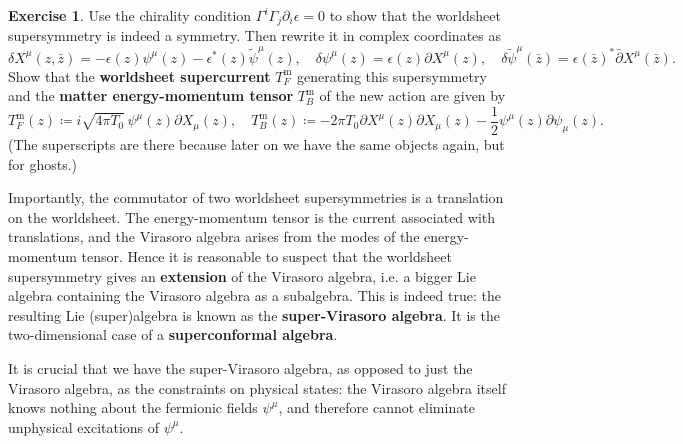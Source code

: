 \documentclass{report}
\theoremstyle{plain}
\theoremstyle{definition}
\newtheorem{exercise}{Exercise}[section]
\theoremstyle{remark}
\newcommand{\di}{\partial}
\newcommand{\bz}{\bar{z}}
\newcommand{\bdi}{\bar{\di}}
\begin{document}
\begin{exercise}
  Use the chirality condition $\Gamma^i \Gamma_j \di_i \epsilon = 0$
  to show that the worldsheet supersymmetry is indeed a symmetry. Then
  rewrite it in complex coordinates as
  \[ \delta X^\mu(z, \bz) = -\epsilon(z) \psi^\mu(z) - \epsilon^*(z) \tilde{\psi}^\mu(z), \quad \delta \psi^\mu(z) = \epsilon(z) \di X^\mu(z), \quad \delta \tilde{\psi}^\mu(\bz) = \epsilon(\bz)^* \bdi X^\mu(\bz). \]
  Show that the {\bf worldsheet supercurrent} $T_F^{\text{m}}$
  generating this supersymmetry and the {\bf matter energy-momentum
    tensor} $T_B^{\text{m}}$ of the new action are given by
  \[ T_F^{\text{m}}(z) \coloneqq i\sqrt{4\pi T_0} \, \psi^\mu(z) \di X_\mu(z), \quad T_B^{\text{m}}(z) \coloneqq -2\pi T_0 \di X^\mu(z) \di X_\mu(z) - \frac{1}{2} \psi^\mu(z) \di \psi_\mu(z). \]
  (The superscripts are there because later on we have the same
  objects again, but for ghosts.)
\end{exercise}

Importantly, the commutator of two worldsheet supersymmetries is a
translation on the worldsheet. The energy-momentum tensor is the
current associated with translations, and the Virasoro algebra arises
from the modes of the energy-momentum tensor. Hence it is reasonable
to suspect that the worldsheet supersymmetry gives an {\bf extension}
of the Virasoro algebra, i.e. a bigger Lie algebra containing the
Virasoro algebra as a subalgebra. This is indeed true: the resulting
Lie (super)algebra is known as the {\bf super-Virasoro algebra}. It is
the two-dimensional case of a {\bf superconformal algebra}.

It is crucial that we have the super-Virasoro algebra, as opposed to
just the Virasoro algebra, as the constraints on physical states: the
Virasoro algebra itself knows nothing about the fermionic fields
$\psi^\mu$, and therefore cannot eliminate unphysical excitations of
$\psi^\mu$.
\end{document}
